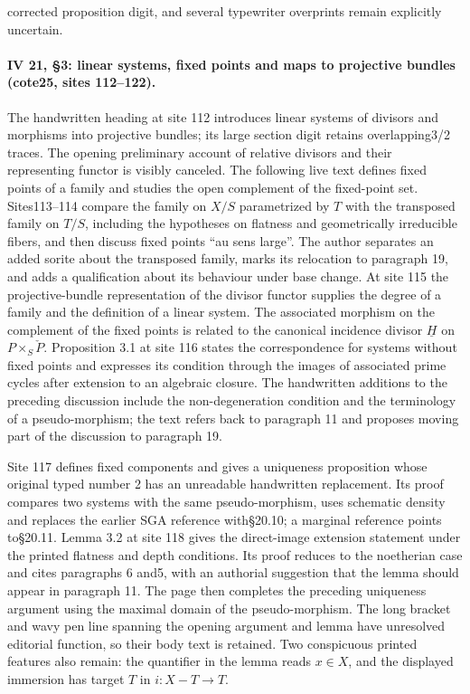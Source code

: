 \documentclass[10pt,a4paper]{article}
\begin{document}
corrected proposition digit, and several typewriter overprints remain explicitly uncertain.
\par{}

\par{}
\paragraph{IV 21, \S3: linear systems, fixed points and maps to projective bundles (cote25, sites 112--122).}
The handwritten heading at site 112 introduces linear systems of divisors and morphisms into projective bundles; its large section digit retains overlapping3/2 traces. The opening preliminary account of relative divisors and their representing functor is visibly canceled. The following live text defines fixed points of a family and studies the open complement of the fixed-point set. Sites113--114 compare the family on $X/S$ parametrized by $T$ with the transposed family on $T/S$, including the hypotheses on flatness and geometrically irreducible fibers, and then discuss fixed points ``au sens large''. The author separates an added sorite about the transposed family, marks its relocation to paragraph 19, and adds a qualification about its behaviour under base change. At site 115 the projective-bundle representation of the divisor functor supplies the degree of a family and the definition of a linear system. The associated morphism on the complement of the fixed points is related to the canonical incidence divisor $\underline H$ on $P\times_S\check P$. Proposition 3.1 at site 116 states the correspondence for systems without fixed points and expresses its condition through the images of associated prime cycles after extension to an algebraic closure. The handwritten additions to the preceding discussion include the non-degeneration condition and the terminology of a pseudo-morphism; the text refers back to paragraph 11 and proposes moving part of the discussion to paragraph 19.

Site 117 defines fixed components and gives a uniqueness proposition whose original typed number 2 has an unreadable handwritten replacement. Its proof compares two systems with the same pseudo-morphism, uses schematic density and replaces the earlier SGA reference with\S20.10; a marginal reference points to\S20.11. Lemma 3.2 at site 118 gives the direct-image extension statement under the printed flatness and depth conditions. Its proof reduces to the noetherian case and cites paragraphs 6 and5, with an authorial suggestion that the lemma should appear in paragraph 11. The page then completes the preceding uniqueness argument using the maximal domain of the pseudo-morphism. The long bracket and wavy pen line spanning the opening argument and lemma have unresolved editorial function, so their body text is retained. Two conspicuous printed features also remain: the quantifier in the lemma reads $x\in X$, and the displayed immersion has target $T$ in $i:X-T\to T$.
\end{document}
